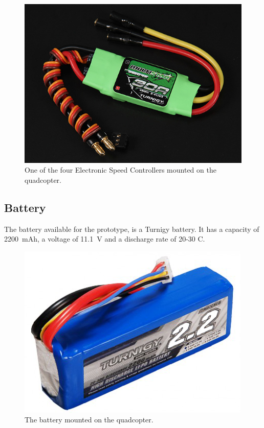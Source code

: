 %
\begin{figure}[H]
	\centering
	\includegraphics[scale=0.3]{figures/ESC}
	\caption{One of the four Electronic Speed Controllers mounted on the quadcopter.\cite{HKing}}
	\label{fig:esc}
\end{figure}
%
\subsection{Battery}
The battery available for the prototype, is a Turnigy battery. It has a capacity of \SI{2200}{mAh}, a voltage of \SI{11.1}{V} and a discharge rate of 20-30 C.\cite{HKingBattery}

\begin{figure}[H]
	\centering
	\includegraphics[scale=0.5]{figures/BatteryPicturephoto}
	\caption{The battery mounted on the quadcopter.\cite{HKingBatterypicture}}
	\label{fig:battery}
\end{figure}
%

